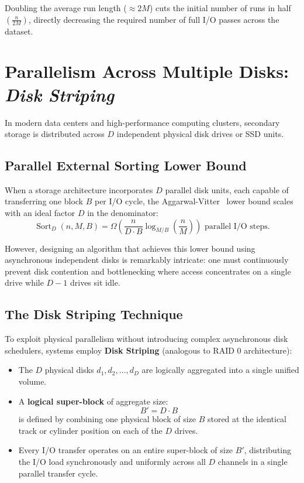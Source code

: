 Doubling the average run length ($\approx 2M$) cuts the initial number of runs in half $\left(\frac{n}{2M}\right)$, directly decreasing the required number of full I/O passes across the dataset.

\section{Parallelism Across Multiple Disks: \texorpdfstring{\emph{Disk Striping}}{Disk Striping}}
\label{sec:disk-striping}

In modern data centers and high-performance computing clusters, secondary storage is distributed across $D$ independent physical disk drives or SSD units.

\subsection{Parallel External Sorting Lower Bound}
\label{subsec:parallel-lower-bound}

When a storage architecture incorporates $D$ parallel disk units, each capable of transferring one block $B$ per I/O cycle, the Aggarwal-Vitter~\cite{aggarwal1988} lower bound scales with an ideal factor $D$ in the denominator:
\begin{equation}
  \operatorname{Sort}_D(n, M, B) = \Omega\left(\frac{n}{D \cdot B} \log_{M/B}\left(\frac{n}{M}\right)\right) \text{ parallel I/O steps}.
\end{equation}

However, designing an algorithm that achieves this lower bound using asynchronous independent disks is remarkably intricate: one must continuously prevent disk contention and bottlenecking where access concentrates on a single drive while $D-1$ drives sit idle.

\subsection{The Disk Striping Technique}
\label{subsec:striping-architecture}

To exploit physical parallelism without introducing complex asynchronous disk schedulers, systems employ \textbf{Disk Striping} (analogous to RAID 0 architecture):
\begin{itemize}
  \item The $D$ physical disks $d_1, d_2, \dots, d_D$ are logically aggregated into a single unified volume.
  \item A \textbf{logical super-block} of aggregate size:
  \begin{equation}
    B' = D \cdot B
  \end{equation}
  is defined by combining one physical block of size $B$ stored at the identical track or cylinder position on each of the $D$ drives.
  \item Every I/O transfer operates on an entire super-block of size $B'$, distributing the I/O load synchronously and uniformly across all $D$ channels in a single parallel transfer cycle.
\end{itemize}

